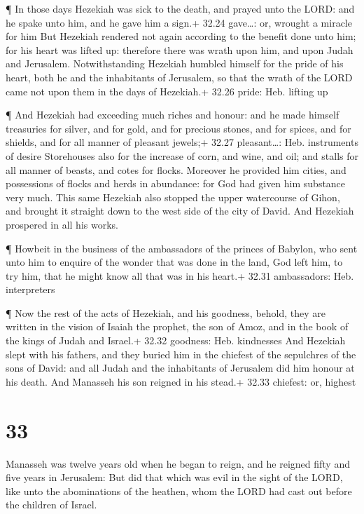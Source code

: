  ¶ In those days Hezekiah was sick to the death, and prayed
unto the LORD: and he spake unto him, and he gave him a sign.+ 32.24
gave\ldots: or, wrought a miracle for him  But Hezekiah
rendered not again according to the benefit done unto him; for his heart
was lifted up: therefore there was wrath upon him, and upon Judah and
Jerusalem.  Notwithstanding Hezekiah humbled himself for
the pride of his heart, both he and the inhabitants of Jerusalem, so
that the wrath of the LORD came not upon them in the days of Hezekiah.+
32.26 pride: Heb. lifting up

 ¶ And Hezekiah had exceeding much riches and honour: and
he made himself treasuries for silver, and for gold, and for precious
stones, and for spices, and for shields, and for all manner of pleasant
jewels;+ 32.27 pleasant\ldots: Heb. instruments of desire 
Storehouses also for the increase of corn, and wine, and oil; and stalls
for all manner of beasts, and cotes for flocks.  Moreover
he provided him cities, and possessions of flocks and herds in
abundance: for God had given him substance very much.  This
same Hezekiah also stopped the upper watercourse of Gihon, and brought
it straight down to the west side of the city of David. And Hezekiah
prospered in all his works.

 ¶ Howbeit in the business of the ambassadors of the
princes of Babylon, who sent unto him to enquire of the wonder that was
done in the land, God left him, to try him, that he might know all that
was in his heart.+ 32.31 ambassadors: Heb. interpreters

 ¶ Now the rest of the acts of Hezekiah, and his goodness,
behold, they are written in the vision of Isaiah the prophet, the son of
Amoz, and in the book of the kings of Judah and Israel.+ 32.32 goodness:
Heb. kindnesses  And Hezekiah slept with his fathers, and
they buried him in the chiefest of the sepulchres of the sons of David:
and all Judah and the inhabitants of Jerusalem did him honour at his
death. And Manasseh his son reigned in his stead.+ 32.33 chiefest: or,
highest

\hypertarget{section-32}{%
\section{33}\label{section-32}}

 Manasseh was twelve years old when he began to reign, and
he reigned fifty and five years in Jerusalem:  But did that
which was evil in the sight of the LORD, like unto the abominations of
the heathen, whom the LORD had cast out before the children of Israel.

